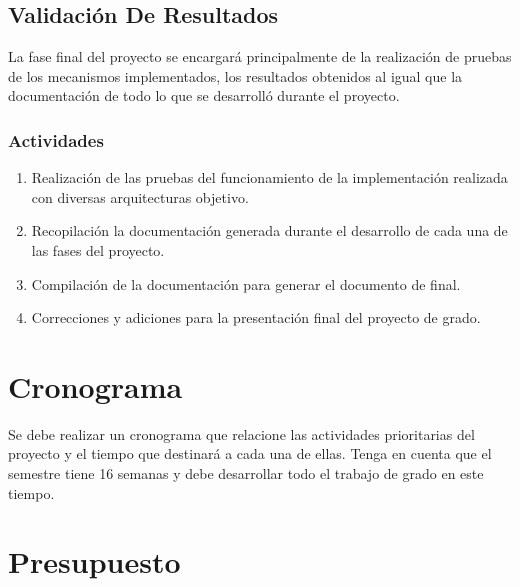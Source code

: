 \documentclass[12pt]{article}
\begin{document}
    \subsection{Validación De Resultados}
    
    La fase final del proyecto se encargará principalmente de la realización de pruebas de los mecanismos implementados, los resultados obtenidos al igual que la documentación de todo lo que se desarrolló durante el proyecto.
    
    \subsubsection*{Actividades}
    
   \begin{enumerate}[label=\thesubsection.\arabic*., wide, labelindent=2em, leftmargin=5em]
        \item Realización de las pruebas del funcionamiento de la implementación realizada con diversas arquitecturas objetivo.
        \item Recopilación la documentación generada durante el desarrollo de cada una de las fases del proyecto.
        \item Compilación de la documentación para generar el documento de final.
        \item Correcciones y adiciones para la presentación final del proyecto de grado.
    \end{enumerate}  

    \section{Cronograma}

    Se debe realizar un cronograma que relacione las actividades prioritarias del proyecto y el tiempo que destinará a cada una de ellas. Tenga en cuenta que el semestre tiene 16 semanas y debe desarrollar todo el trabajo de grado en este tiempo. 

    \section{Presupuesto}
    
\end{document}
